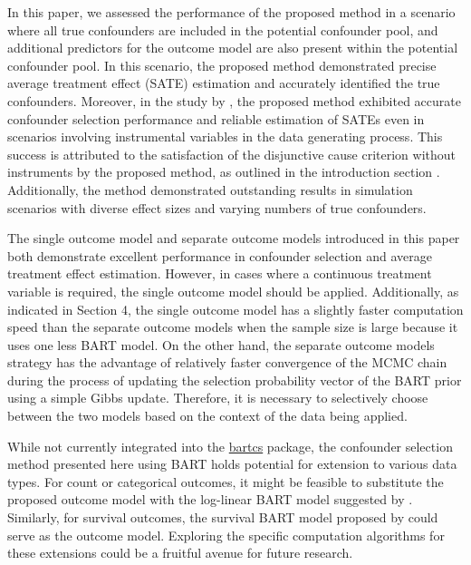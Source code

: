 In this paper, we assessed the performance of the proposed method in a scenario where all true confounders are included in the potential confounder pool, and additional predictors for the outcome model are also present within the potential confounder pool. In this scenario, the proposed method demonstrated precise average treatment effect (SATE) estimation and accurately identified the true confounders. Moreover, in the study by \cite{kim2023bnp}, the proposed method exhibited accurate confounder selection performance and reliable estimation of SATEs even in scenarios involving instrumental variables in the data generating process. This success is attributed to the satisfaction of the disjunctive cause criterion without instruments by the proposed method, as outlined in the introduction section \citep{vanderweele2019principles}. Additionally, the method demonstrated outstanding results in simulation scenarios with diverse effect sizes and varying numbers of true confounders.

The single outcome model and separate outcome models introduced in this paper both demonstrate excellent performance in confounder selection and average treatment effect estimation. However, in cases where a continuous treatment variable is required, the single outcome model should be applied. Additionally, as indicated in Section 4, the single outcome model has a slightly faster computation speed than the separate outcome models when the sample size is large because it uses one less BART model. On the other hand, the separate outcome models strategy has the advantage of relatively faster convergence of the MCMC chain during the process of updating the selection probability vector of the BART prior using a simple Gibbs update. Therefore, it is necessary to selectively choose between the two models based on the context of the data being applied.

While not currently integrated into the \href{https://CRAN.R-project.org/package=bartcs}{bartcs} package, the confounder selection method presented here using BART holds potential for extension to various data types. For count or categorical outcomes, it might be feasible to substitute the proposed outcome model with the log-linear BART model suggested by \cite{murray2021log}. Similarly, for survival outcomes, the survival BART model proposed by \cite{sparapani2016nonparametric} could serve as the outcome model. Exploring the specific computation algorithms for these extensions could be a fruitful avenue for future research.

